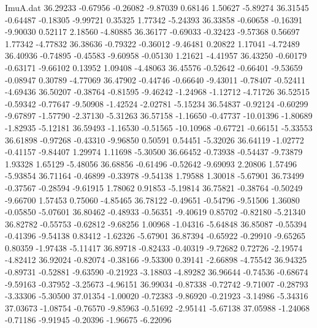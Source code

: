 \begin{filecontents}{ImuA.dat}
  36.29233   -0.67956   -0.26082   -9.87039    0.68146    1.50627   -5.89274
  36.31545   -0.64487   -0.18305   -9.99721    0.35325    1.77342   -5.24393
  36.33858   -0.60658   -0.16391   -9.90030    0.52117    2.18560   -4.80885
  36.36177   -0.69033   -0.32423   -9.57368    0.56697    1.77342   -4.77832
  36.38636   -0.79322   -0.36012   -9.46481    0.20822    1.17041   -4.72489
  36.40936   -0.74895   -0.45583   -9.60958   -0.05130    1.21621   -4.41957
  36.43250   -0.60179   -0.63171   -9.66102    0.13952    1.09408   -4.48063
  36.45576   -0.52642   -0.66401   -9.53659   -0.08947    0.30789   -4.77069
  36.47902   -0.44746   -0.66640   -9.43011   -0.78407   -0.52411   -4.69436
  36.50207   -0.38764   -0.81595   -9.46242   -1.24968   -1.12712   -4.71726
  36.52515   -0.59342   -0.77647   -9.50908   -1.42524   -2.02781   -5.15234
  36.54837   -0.92124   -0.60299   -9.67897   -1.57790   -2.37130   -5.31263
  36.57158   -1.16650   -0.47737  -10.01396   -1.80689   -1.82935   -5.12181
  36.59493   -1.16530   -0.51565  -10.10968   -0.67721   -0.66151   -5.33553
  36.61898   -0.97268   -0.43310   -9.96850    0.50591    0.54451   -5.32026
  36.64119   -1.02772   -0.41157   -9.84407    1.29974    1.11698   -5.30500
  36.66452   -0.73938   -0.54437   -9.73879    1.93328    1.65129   -5.48056
  36.68856   -0.61496   -0.52642   -9.69093    2.20806    1.57496   -5.93854
  36.71164   -0.46899   -0.33978   -9.54138    1.79588    1.30018   -5.67901
  36.73499   -0.37567   -0.28594   -9.61915    1.78062    0.91853   -5.19814
  36.75821   -0.38764   -0.50249   -9.66700    1.57453    0.75060   -4.85465
  36.78122   -0.49651   -0.54796   -9.51506    1.36080   -0.05850   -5.07601
  36.80462   -0.48933   -0.56351   -9.40619    0.85702   -0.82180   -5.21340
  36.82782   -0.55753   -0.62812   -9.68256    1.00968   -1.04316   -5.64848
  36.85087   -0.55394   -0.41396   -9.54138    0.83412   -1.62326   -5.67901
  36.87394   -0.65922   -0.29910   -9.65265    0.80359   -1.97438   -5.11417
  36.89718   -0.82433   -0.40319   -9.72682    0.72726   -2.19574   -4.82412
  36.92024   -0.82074   -0.38166   -9.53300    0.39141   -2.66898   -4.75542
  36.94325   -0.89731   -0.52881   -9.63590   -0.21923   -3.18803   -4.89282
  36.96644   -0.74536   -0.68674   -9.59163   -0.37952   -3.25673   -4.96151
  36.99034   -0.87338   -0.72742   -9.71007   -0.28793   -3.33306   -5.30500
  37.01354   -1.00020   -0.72383   -9.86920   -0.21923   -3.14986   -5.34316
  37.03673   -1.08754   -0.76570   -9.85963   -0.51692   -2.95141   -5.67138
  37.05988   -1.24068   -0.71186   -9.91945   -0.20396   -1.96675   -6.22096

\end{filecontents}
